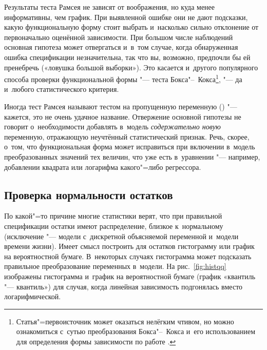 \documentclass[11pt]{article}
\begin{document}
Результаты теста Рамсея не зависят от воображения, но куда менее информативны, чем график. При выявленной ошибке они не дают подсказки, какую функциональную форму стоит выбрать и~насколько сильно отклонение от первоначально оценённой зависимости. При большом числе наблюдений основная гипотеза может отвергаться и~в~том случае, когда обнаруженная ошибка спецификации незначительна, так что вы, возможно, предпочли бы ей пренебречь («ловушка большой выборки»). Это касается и~другого популярного способа проверки функциональной формы "--- теста Бокса"--~Кокса\footnote{Статья"=первоисточник \citep{boxcox64} может оказаться нелёгким чтивом, но можно ознакомиться с~сутью преобразования Бокса"--~Кокса и~его использованием для определения формы зависимости по работе \citet{sakia92}.}\fnnsp, "--- да и~любого статистического критерия.

Иногда тест Рамсея называют тестом на пропущенную переменную () "--- кажется, это не очень удачное название. Отвержение основной гипотезы не говорит о~необходимости добавлять в~модель \textit{содержательно новую} переменную, отражающую неучтённый статистический признак. Речь, скорее, о~том, что функциональная форма может исправиться при включении в~модель преобразованных значений тех величин, что уже есть в~уравнении "--- например, добавлении квадрата или логарифма какого"=либо регрессора.

\subsection{Проверка нормальности остатков}

По какой"=то причине многие статистики верят, что при правильной спецификации остатки имеют распределение, близкое к~нормальному (исключение "--- модели с~дискретной объясняемой переменной и~модели времени жизни). Имеет смысл построить для остатков гистограмму или график на вероятностной бумаге. В~некоторых случаях гистограмма может подсказать правильное преобразование переменных в~модели. На рис.~\ref{fig:histqq} изображены гистограмма и~график на вероятностной бумаге (график «квантиль "--- квантиль») для случая, когда линейная зависимость подгонялась вместо логарифмической.
\end{document}
